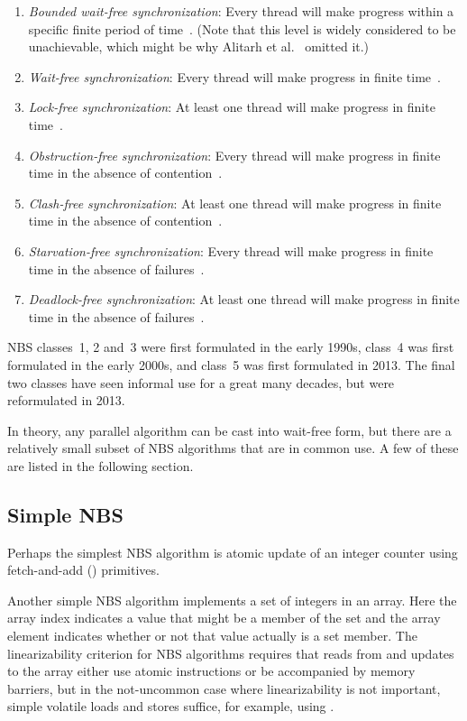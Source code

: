 \begin{enumerate}
\item	\emph{Bounded wait-free synchronization}: Every thread
	will make progress within
	a specific finite period of time~\cite{Herlihy91}.
	(Note that this level is 
	widely considered to be unachievable, which might be why
	Alitarh et al.~\cite{DanAlitarh2013PracticalProgress}
	omitted it.)
\item	\emph{Wait-free synchronization}: Every thread will make progress
	in finite time~\cite{Herlihy93}.
\item	\emph{Lock-free synchronization}: At least one thread will
	make progress in finite time~\cite{Herlihy93}.
\item	\emph{Obstruction-free synchronization}: Every thread will
	make progress in finite time in the absence of
	contention~\cite{HerlihyLM03}.
\item	\emph{Clash-free synchronization}: At least one thread will
	make progress in finite time in the absence of
	contention~\cite{DanAlitarh2013PracticalProgress}.
\item	\emph{Starvation-free synchronization}: Every thread will
	make progress in finite time in the absence of
	failures~\cite{DanAlitarh2013PracticalProgress}.
\item	\emph{Deadlock-free synchronization}: At least one thread will
	make progress in finite time in the absence of
	failures~\cite{DanAlitarh2013PracticalProgress}.
\end{enumerate}

NBS classes~1, 2 and~3 were first formulated in the early 1990s,
class~4 was first formulated in the early 2000s,
and class~5 was first formulated in 2013.
The final two classes have seen informal use for a great many decades,
but were reformulated in 2013.

In theory, any parallel algorithm can be cast into wait-free form,
but there are a relatively small subset of NBS algorithms that are
in common use.
A few of these are listed in the following section.

\subsection{Simple NBS}
\label{sec:advsync:Simple NBS}

Perhaps the simplest NBS algorithm is atomic update of an integer
counter using fetch-and-add () primitives.

Another simple NBS algorithm implements a set of integers in an array.
Here the array index indicates a value that might be a member of the set
and the array element indicates whether or not that value actually is
a set member.
The linearizability criterion for NBS algorithms requires that reads from
and updates to the array either use atomic instructions or be accompanied
by memory barriers, but in the not-uncommon case where linearizability
is not important, simple volatile loads and stores suffice, for example,
using .

